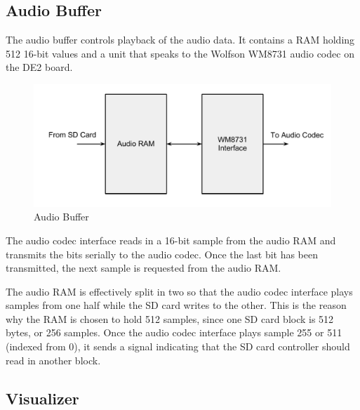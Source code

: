 \documentclass{article}
\begin{document}
\subsection{Audio Buffer}

The audio buffer controls playback of the audio data. It contains a RAM
holding 512 16-bit values and a unit that speaks to the Wolfson WM8731
audio codec on the DE2 board.

\begin{figure}[H]
	\centering
	\includegraphics[scale=0.3]{audio-buffer}
	\caption{Audio Buffer}
\end{figure}

The audio codec interface reads in a 16-bit sample from the audio RAM and
transmits the bits serially to the audio codec. Once the last bit has been
transmitted, the next sample is requested from the audio RAM.

The audio RAM is effectively split in two so that the audio codec interface
plays samples from one half while the SD card writes to the other. This is
the reason why the RAM is chosen to hold 512 samples, since one SD card
block is 512 bytes, or 256 samples. Once the audio codec interface plays 
sample 255 or 511 (indexed from 0), it sends a signal indicating that the 
SD card controller should read in another block.

\subsection{Visualizer} 
\end{document}
